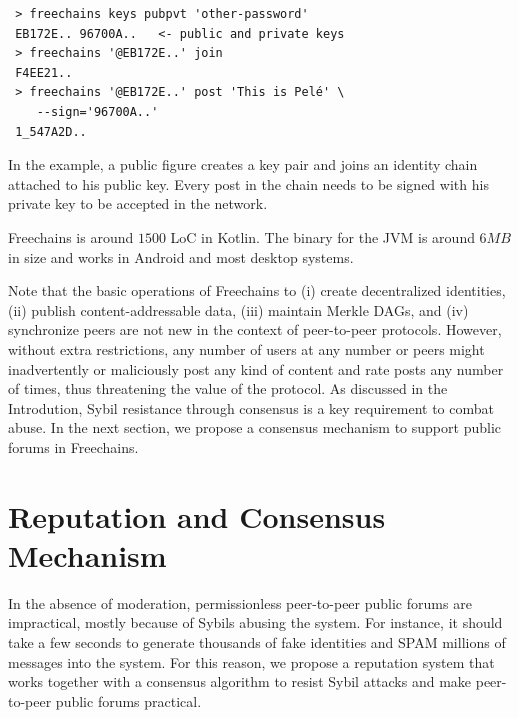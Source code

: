 \documentclass[10pt,journal,compsoc]{IEEEtran}
\newcommand{\FC}       {Freechains\xspace}
\begin{document}
{\footnotesize
\begin{verbatim}
 > freechains keys pubpvt 'other-password'
 EB172E.. 96700A..   <- public and private keys
 > freechains '@EB172E..' join
 F4EE21..
 > freechains '@EB172E..' post 'This is Pelé' \
    --sign='96700A..'
 1_547A2D..
\end{verbatim}
}

In the example, a public figure creates a key pair and joins an identity chain
attached to his public key.
Every post in the chain needs to be signed with his private key to be accepted
in the network.

\FC is around $1500$ LoC in Kotlin. %
The binary for the JVM is around $6MB$ in size and works in Android and most
desktop systems.

Note that the basic operations of Freechains to (i) create decentralized
identities, (ii) publish content-addressable data, (iii) maintain Merkle DAGs,
and (iv) synchronize peers are not new in the context of peer-to-peer
protocols.
%
However, without extra restrictions, any number of users at any number or peers
might inadvertently or maliciously post any kind of content and rate posts any
number of times, thus threatening the value of the protocol.
%
As discussed in the Introdution, Sybil resistance through consensus is a key
requirement to combat abuse.
%
In the next section, we propose a consensus mechanism to support public forums
in \FC.

\section{Reputation and Consensus Mechanism}
\label{sec.consensus}

In the absence of moderation, permissionless peer-to-peer public forums are
impractical, mostly because of Sybils abusing the system.
For instance, it should take a few seconds to generate thousands of fake
identities and SPAM millions of messages into the system.
For this reason, we propose a reputation system that works together with a
consensus algorithm to resist Sybil attacks and make peer-to-peer public forums
practical.
\end{document}

